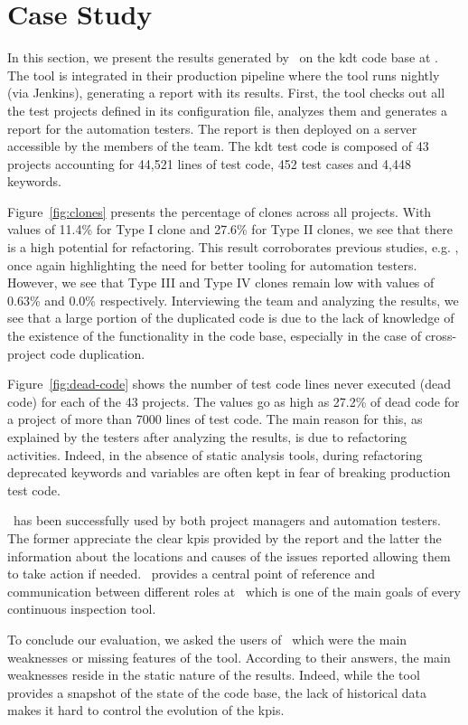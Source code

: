\section{Case Study}

In this section, we present the results generated by \tool~on the \gls{kdt} code base at \BGL. The tool is integrated in their production pipeline where the tool runs nightly (via Jenkins), generating a report with its results. First, the tool checks out all the test projects defined in its configuration file, analyzes them and generates a report for the automation testers. The report is then deployed on a server accessible by the members of the team. The \gls{kdt} test code is composed of 43 projects accounting for 44,521 lines of test code, 452 test cases and 4,448 keywords.

Figure~\ref{fig:clones} presents the percentage of clones across all projects. With values of 11.4\% for Type I clone and 27.6\% for Type II clones, we see that there is a high potential for refactoring. This result corroborates previous studies, e.g. \cite{Lavoie2017}, once again highlighting the need for better tooling for automation testers. However, we see that Type III and Type IV clones remain low with values of 0.63\% and 0.0\% respectively. Interviewing the team and analyzing the results, we see that a large portion of the duplicated code is due to the lack of knowledge of the existence of the functionality in the code base, especially in the case of cross-project code duplication.

Figure~\ref{fig:dead-code} shows the number of test code lines never executed (dead code) for each of the 43 projects. The values go as high as 27.2\% of dead code for a project of more than 7000 lines of test code. The main reason for this, as explained by the testers after analyzing the results, is due to refactoring activities. Indeed, in the absence of static analysis tools, during refactoring deprecated keywords and variables are often kept in fear of breaking production test code.

\tool~has been successfully used by both project managers and automation testers. The former appreciate the clear \gls{kpi}s provided by the report and the latter the information about the locations and causes of the issues reported allowing them to take action if needed. \tool~provides a central point of reference and communication between different roles at \BGL~which is one of the main goals of every continuous inspection tool.

To conclude our evaluation, we asked the users of \tool~which were the main weaknesses or missing features of the tool. According to their answers, the main weaknesses reside in the static nature of the results. Indeed, while the tool provides a snapshot of the state of the code base, the lack of historical data  makes it hard to control the evolution of the \gls{kpi}s.